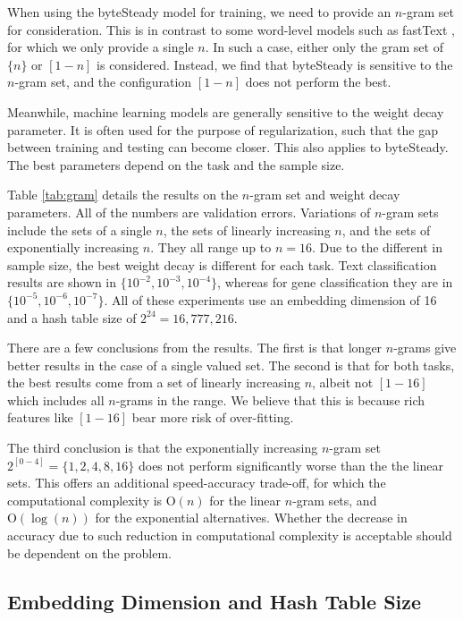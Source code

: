 \documentclass[sigconf,review, anonymous]{acmart}
\begin{document}
When using the byteSteady model for training, we need to provide an \(n\)-gram set for consideration. This is in contrast to some word-level models such as fastText \cite{JGBM16}, for which we only provide a single \(n\). In such a case, either only the gram set of \(\{n\}\) or \([1-n]\) is considered. Instead, we find that byteSteady is sensitive to the \(n\)-gram set, and the configuration \([1-n]\) does not perform the best.

Meanwhile, machine learning models are generally sensitive to the weight decay parameter. It is often used for the purpose of regularization, such that the gap between training and testing can become closer. This also applies to byteSteady. The best parameters depend on the task and the sample size.

Table \ref{tab:gram} details the results on the \(n\)-gram set and weight decay parameters. All of the numbers are validation errors. Variations of \(n\)-gram sets include the sets of a single \(n\), the sets of linearly increasing \(n\), and the sets of exponentially increasing \(n\). They all range up to \(n=16\). Due to the different in sample size, the best weight decay is different for each task. Text classification results are shown in \(\{10^{-2}, 10^{-3}, 10^{-4}\}\), whereas for gene classification they are in \(\{10^{-5}, 10^{-6}, 10^{-7}\}\). All of these experiments use an embedding dimension of 16 and a hash table size of \(2^{24}=16,777,216\).

There are a few conclusions from the results. The first is that longer \(n\)-grams give better results in the case of a single valued set. The second is that for both tasks, the best results come from a set of linearly increasing \(n\), albeit not \([1-16]\) which includes all \(n\)-grams in the range. We believe that this is because rich features like \([1-16]\) bear more risk of over-fitting.

The third conclusion is that the exponentially increasing \(n\)-gram set \(2^{[0-4]}=\{1,2,4,8,16\}\) does not perform significantly worse than the the linear sets. This offers an additional speed-accuracy trade-off, for which the computational complexity is \(\mathrm{O}(n)\) for the linear \(n\)-gram sets, and \(\mathrm{O}(\log(n))\) for the exponential alternatives. Whether the decrease in accuracy due to such reduction in computational complexity is acceptable should be dependent on the problem.

\subsection{Embedding Dimension and Hash Table Size}
\end{document}
